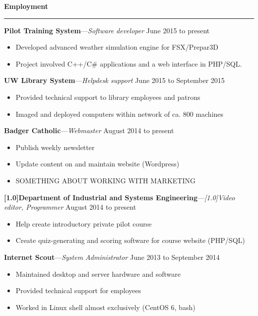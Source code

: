 \documentclass[12pt,letterpaper]{article}
\newenvironment{details}{
    \vspace{-.5em}
    \begin{itemize}
        \renewcommand \labelitemi{\labelitemiv}
        \setlength{\itemsep}{0pt}
        \setlength{\parskip}{-1pt}
        \setlength{\parsep}{0pt}
    }{
    \end{itemize}
    \vspace{-.5em}
}
\newcommand{\hr} {
    \vspace{-1em}
    \par\rule{\textwidth}{1pt}
    \vspace{-1.5em}
}
\newcommand{\ressection}[1] {
    \par{\large \textbf{#1}}
    \hr
}
\newenvironment{employment} {
    \setlength{\parskip}{0pt}
    \ressection{Employment}
}{
    \vspace{0.5em}
}
\newcommand{\employer}[3] {
    \vspace{3pt}
    {\par\textbf{#1}---\textit{#2} \hfill #3}
    \par
}
\begin{document}
\begin{employment} 

\employer{Pilot Training System}{Software developer}{June 2015 to present}
\begin{details}
    \item Developed advanced weather simulation engine for FSX/Prepar3D
    \item Project involved C++/C\# applications and a web interface in PHP/SQL.
\end{details}

\employer{UW Library System}{Helpdesk support}{June 2015 to September 2015}
\begin{details}
    \item Provided technical support to library employees and patrons
    \item Imaged and deployed computers within network of ca. 800 machines
\end{details}

\employer{Badger Catholic}{Webmaster}{August 2014 to present}
\begin{details}
    \item Publish weekly newsletter
    \item Update content on and maintain website (Wordpress)
    \item SOMETHING ABOUT WORKING WITH MARKETING
\end{details}

\employer{\scalebox{.9}[1.0]{Department of Industrial and Systems Engineering}}{\scalebox{.9}[1.0]{Video editor, Programmer}}{August 2014 to present}
\begin{details}
    \item Help create introductory private pilot course
    \item Create quiz-generating and scoring software for course website (PHP/SQL)
\end{details}

\employer{Internet Scout}{System Administrator}{June 2013 to September 2014}
\begin{details}
    \item Maintained desktop and server hardware and software
    \item Provided technical support for employees
    \item Worked in Linux shell almost exclusively (CentOS 6, bash)
\end{details}

\end{employment}
\end{document}
